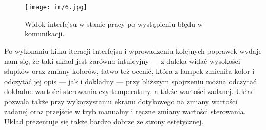 \begin{figure}[H]
\centering
\texttt{[image: im/6.jpg]}
\caption{Widok interfejsu w stanie pracy po wystąpieniu błędu w komunikacji.}
\label{R6}
\end{figure}


Po wykonaniu kilku iteracji interfejsu i wprowadzeniu kolejnych poprawek wydaje nam się, że taki układ jest zarówno intuicyjny --- z daleka widać wysokości słupków oraz zmiany kolorów, łatwo też ocenić, która z lampek zmieniła kolor i odczytać jej opis --- jak i dokładny --- przy bliższym spojrzeniu można odczytać dokładne wartości sterowania czy temperatury, a także wartości zadanej. Układ pozwala także przy wykorzystaniu ekranu dotykowego na zmiany wartości zadanej oraz przejście w tryb manualny i ręczne zmiany wartości sterowania. Układ prezentuje się także bardzo dobrze ze strony estetycznej.
